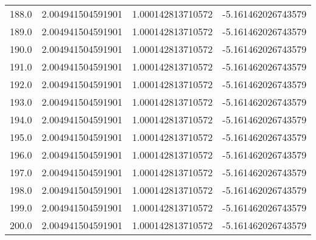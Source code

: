 \begin{longtable}{lrrr}
188.0 & 2.004941504591901 & 1.000142813710572 & -5.161462026743579 \\
189.0 & 2.004941504591901 & 1.000142813710572 & -5.161462026743579 \\
190.0 & 2.004941504591901 & 1.000142813710572 & -5.161462026743579 \\
191.0 & 2.004941504591901 & 1.000142813710572 & -5.161462026743579 \\
192.0 & 2.004941504591901 & 1.000142813710572 & -5.161462026743579 \\
193.0 & 2.004941504591901 & 1.000142813710572 & -5.161462026743579 \\
194.0 & 2.004941504591901 & 1.000142813710572 & -5.161462026743579 \\
195.0 & 2.004941504591901 & 1.000142813710572 & -5.161462026743579 \\
196.0 & 2.004941504591901 & 1.000142813710572 & -5.161462026743579 \\
197.0 & 2.004941504591901 & 1.000142813710572 & -5.161462026743579 \\
198.0 & 2.004941504591901 & 1.000142813710572 & -5.161462026743579 \\
199.0 & 2.004941504591901 & 1.000142813710572 & -5.161462026743579 \\
200.0 & 2.004941504591901 & 1.000142813710572 & -5.161462026743579 \\
\end{longtable}